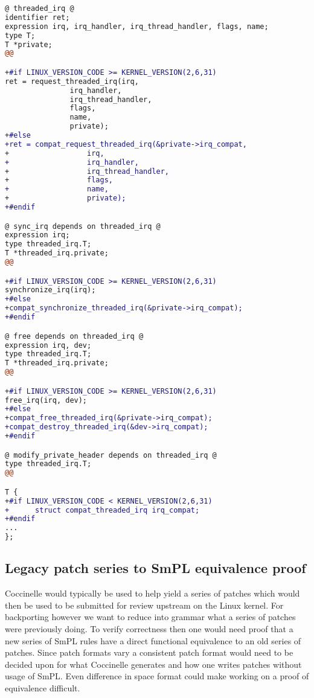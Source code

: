 \documentclass[a4paper,10pt]{article}
\begin{document}
\begin{lstlisting}[language=diff]
@ threaded_irq @
identifier ret;
expression irq, irq_handler, irq_thread_handler, flags, name;
type T;
T *private;
@@

+#if LINUX_VERSION_CODE >= KERNEL_VERSION(2,6,31)
ret = request_threaded_irq(irq,
			   irq_handler,
			   irq_thread_handler,
			   flags,
			   name,
			   private);
+#else
+ret = compat_request_threaded_irq(&private->irq_compat,
+				   irq,
+				   irq_handler,
+				   irq_thread_handler,
+				   flags,
+				   name,
+				   private);
+#endif

@ sync_irq depends on threaded_irq @
expression irq;
type threaded_irq.T;
T *threaded_irq.private;
@@

+#if LINUX_VERSION_CODE >= KERNEL_VERSION(2,6,31)
synchronize_irq(irq);
+#else
+compat_synchronize_threaded_irq(&private->irq_compat);
+#endif

@ free depends on threaded_irq @
expression irq, dev;
type threaded_irq.T;
T *threaded_irq.private;
@@

+#if LINUX_VERSION_CODE >= KERNEL_VERSION(2,6,31)
free_irq(irq, dev);
+#else
+compat_free_threaded_irq(&private->irq_compat);
+compat_destroy_threaded_irq(&dev->irq_compat);
+#endif

@ modify_private_header depends on threaded_irq @
type threaded_irq.T;
@@

T {
+#if LINUX_VERSION_CODE < KERNEL_VERSION(2,6,31)
+      struct compat_threaded_irq irq_compat;
+#endif
...
};
\end{lstlisting}

\subsection{Legacy patch series to SmPL equivalence proof}

Coccinelle would typically be used to help yield a series of patches which
would then be used to be submitted for review upstream on the Linux kernel. For
backporting however we want to reduce into grammar what a series of patches
were previously doing. To verify correctness then one would need proof that a
new series of SmPL rules have a direct functional equivalence to an old series
of patches. Since patch formats vary a consistent patch format would need to be
decided upon for what Coccinelle generates and how one writes patches without
usage of SmPL. Even difference in space format could make working on a proof of
equivalence difficult.
\end{document}
